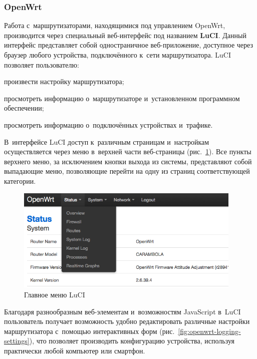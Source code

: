 \subsubsection{OpenWrt}
\label{subsec:openwrt-review}

Работа с~маршрутизаторами, находящимися под управлением OpenWrt, производится через специальный веб-интерфейс под названием \textbf{LuCI}. Данный интерфейс представляет собой одностраничное веб-приложение, доступное через браузер любого устройства, подключённого к~сети маршрутизатора. LuCI позволяет пользователю:

\begin{dashitemize}
  \item произвести настройку маршрутизатора;
  \item просмотреть информацию о~маршрутизаторе и~установленном программном обеспечении;
  \item просмотреть информацию о~подключённых устройствах и~трафике.
\end{dashitemize}

В~интерфейсе LuCI доступ к~различным страницам и~настройкам осуществляется через меню в~верхней части веб-страницы (рис.~\ref{fig:openwrt-menu}). Все пункты верхнего меню, за исключением кнопки выхода из системы, представляют собой выпадающие меню, позволяющие перейти на одну из страниц соответствующей категории.

\begin{figure}[h!]
  \centering
  \includegraphics[height=5cm]{img/openwrt-menu}
  \vspace*{12pt}
  \caption{Главное меню LuCI}\label{fig:openwrt-menu}
\end{figure}

Благодаря разнообразным веб-элементам и~возможностям JavaScript в~LuCI пользователь получает возможность удобно редактировать различные настройки маршрутизатора с~помощью интерактивных форм (рис.~\ref{fig:openwrt-logging-settings}), что позволяет производить конфигурацию устройства, используя практически любой компьютер или смартфон.

